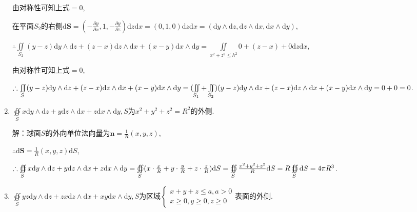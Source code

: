 \documentclass[12pt,UTF8,fleqn]{ctexart}
\newcommand{\varIInt}[4]{\iint\limits_{#1}#2\mathrm d#3\mathrm d#4}
\newcommand{\md}[1]{\mathrm d#1}
\newcommand{\BSIInt}[2]{\iint\limits_{#1}#2}
\newcommand{\pp}[2]{\frac{\partial #1}{\partial #2}}
\newcommand{\BSOIInt}[2]{\oiint\limits_{#1}#2}
\begin{document}
\begin{enumerate}
由对称性可知上式$=0$,

在平面$S_2$的右侧$\md\bm S=(-\pp yx,1,-\pp yz)\md z\md x=(0,1,0)\md z\md x=(\md y\wedge\md z,\md z\wedge\md x,\md x\wedge\md y)$,

$\therefore\BSIInt{S_2}{(y-z)\md y\wedge\md z+(z-x)\md z\wedge\md x+(x-y)\md x\wedge\md y}=\varIInt{x^2+z^2\leqslant h^2}{0+(z-x)+0}zx$,

由对称性可知上式$=0$,

$\therefore\BSIInt S{(y-z)\md y\wedge\md z+(z-x)\md z\wedge\md x+(x-y)\md x\wedge\md y}\\
=(\BSIInt{S_1}+\BSIInt{S_2}{)(y-z)\md y\wedge\md z+(z-x)\md z\wedge\md x+(x-y)\md x\wedge\md y}\\
=0+0=0$.

\item$\BSOIInt S{x\md y\wedge\md z+y\md z\wedge\md x+z\md x\wedge\md y},S$为$x^2+y^2+z^2=R^2$的外侧.

解：球面$S$的外向单位法向量为$\bm n=\frac1R(x,y,z)$,

$\therefore\md\bm S=\frac1R(x,y,z)\md S$,

$\therefore\BSOIInt S{x\md y\wedge\md z+y\md z\wedge\md x+z\md x\wedge\md y}=\BSOIInt S{(x\cdot\frac xR+y\cdot\frac yR+z\cdot\frac zR)\md S}=\BSOIInt S{\frac{x^2+y^2+z^2}R\md S}\\
=R\BSOIInt S\md S=4\pi R^3$.

\item$\BSOIInt S{yz\md y\wedge\md z+zx\md z\wedge\md x+xy\md x\wedge\md y},S$为区域$\begin{cases}
x+y+z\leqslant a,a>0\\
x\geqslant0,y\geqslant0,z\geqslant0
\end{cases}$表面的外侧.


\end{enumerate}
\end{document}
